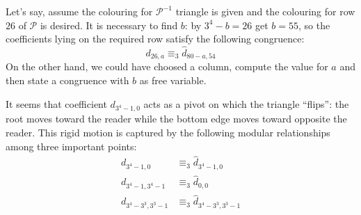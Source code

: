 Let's say, assume the colouring for $\mathcal{P}^{-1}$ triangle is
given and the colouring for row $26$ of $\mathcal{P}$ is desired. It
is necessary to find $b$: by $3^4 -b=26$ get $b=55$, so the
coefficients lying on the required row satisfy the following congruence:
\begin{displaymath}
        d_{26,a} \equiv_{3} \hat{d}_{80-a,54} 
\end{displaymath}
On the other hand, we could have choosed a column, compute the value 
for $a$ and then state a congruence with $b$ as free variable.

\iffalse
\\\\
A question is still open: why do we choose row $3^4$ as reference
row?

It is useful to recall a theorem due to Fine:
\begin{theorem}
  A necessary and sufficient condition for a binomial coefficient
  ${{n} \choose {m}}$ to be divisible by a prime $p$ is that $n$
  be a power of $p$.
\end{theorem}
Consider the colouring for triangle $\mathcal{P}$, we can use the
given theorem to point out ``interesting'' rows, namely those rows
affected by the theorem, they correspond to powers
$3^1, 3^2, 3^3, 3^4, \ldots$, each one of them can be easily
recognized since dots lying on it have all the same colour. In the
triangle $127$ former rows are drawn and in order to have ``more
space'' to find a modular relationship between $d_{nk}$ and
$\hat{d}_{nk}$ we choose as \emph{reference} row the one with
index $3^4$.  From here we start moving backwards by rows toward
the root: observe that the entire row $3^4 -1$, containing
$3^4 -1$ remainders, of triangle $\mathcal{P}$ is the first
segment of the first column of $\mathcal{P}^{-1}$, in other words
$d_{3^4 -1,a} \equiv_{3} \hat{d}_{3^4 -1 -a, 0}$ for
$a \in \lbrace 0, \ldots, 3^4 -1\rbrace$.

\fi

It seems that coefficient $d_{3^4-1,0}$ acts as a pivot on which
the triangle ``flips'': the root moves toward the reader while the
bottom edge moves toward opposite the reader. This rigid motion is
captured by the following modular relationships among three
important points:
\begin{displaymath}
    \begin{split}
        d_{3^4 -1,0} &\equiv_{3} \hat{d}_{3^4 -1,0} \\
        d_{3^4 -1,3^4 -1} &\equiv_{3} \hat{d}_{0,0} \\
        d_{3^4 -3^3,3^3-1} &\equiv_{3} \hat{d}_{3^4 -3^3,3^3-1} \\
    \end{split}
\end{displaymath}

